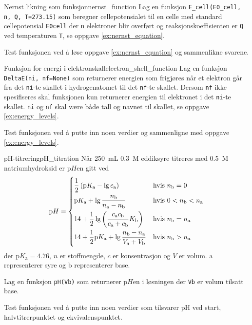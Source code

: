 \exercisechapter

\begin{exercise}{Nernst likning som funksjon}{nernst_function}
	Lag en funksjon \texttt{E_cell(E0_cell, n, Q, T=273.15)} som beregner cellepotensialet til en celle med standard cellepotensial \texttt{E0cell} der \texttt{n} elektroner blir overført og reaksjonskoeffisienten er \texttt{Q} ved temperaturen \texttt{T}, se oppgave \ref{ex:nernst_equation}.
	
	Test funksjonen ved å løse oppgave \ref{ex:nernst_equation} og sammenlikne svarene.
\end{exercise}

\begin{exercise}{Funksjon for energi i elektronskall}{electron_shell_function}
	Lag en funksjon \texttt{DeltaE(ni, nf=None)} som returnerer energien som frigjøres når et elektron går fra det \texttt{ni}-te skallet i hydrogenatomet til det \texttt{nf}-te skallet. Dersom \texttt{nf} ikke spesifiseres skal funksjonen kun returnerer energien til elektronet i det \texttt{ni}-te skallet. \texttt{ni} og \texttt{nf} skal være både tall og navnet til skallet, se oppgave \ref{ex:energy_levels}.
	
	Test funksjonen ved å putte inn noen verdier og sammenligne med oppgave \ref{ex:energy_levels}.
\end{exercise}

\begin{exercise}{pH-titrering}{pH_titration}
	Når \SI{250}{\milli\liter} \SI{0.3}{M} eddiksyre titreres med \SI{0.5}{M} natriumhydroksid er $\mathrm{p}H$en gitt ved
	\begin{equation*}
		\mathrm{p}H = 
		\begin{dcases}
			\frac12\left( \mathrm{p}K_\mathrm{a}-\lg c_\mathrm{a}\right) &\mbox{hvis }n_\mathrm{b}=0 \\
			\mathrm{p}K_\mathrm{a}+\lg\frac{n_\mathrm{b}}{n_\mathrm{a}-n_\mathrm{b}}&\mbox{hvis }0<n_\mathrm{b}<n_\mathrm{a}\\
			14+\frac12\lg\left( \frac{c_\mathrm{a}c_\mathrm{b}}{c_\mathrm{a}+c_\mathrm{b}}K_\mathrm{b}\right) &\mbox{hvis }n_\mathrm{b}=n_\mathrm{a}\\
			14+\frac12\mathrm{p}K_\mathrm{a}+\lg\frac{n_\mathrm{b} -n_\mathrm{a}}{V_\mathrm{a}+V_\mathrm{b}}&\mbox{hvis }n_\mathrm{b}>n_\mathrm{a}
		\end{dcases}
	\end{equation*}
	der $\mathrm{p}K_\mathrm{a}=4.76$, $n$ er stoffmengde, $c$ er konsentrasjon og $V$ er volum. $\mathrm{a}$ representerer syre og $\mathrm{b}$ representerer base.
	
	Lag en funksjon \texttt{pH(Vb)} som returnerer $\mathrm{p}H$en i løsningen der \texttt{Vb} er volum tilsatt base.
	
	Test funksjonen ved å putte inn noen verdier som tilsvarer pH ved start, halvtitrerpunktet og ekvivalenspunktet.
\end{exercise}

